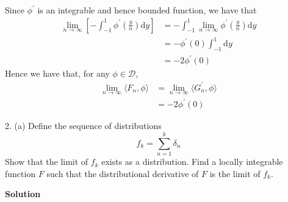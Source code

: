 \documentclass{article}
\begin{document}
%
Since $\phi^\prime$ is an integrable and hence bounded function, we have that
%
\begin{align*}
    \lim_{n \to \infty} \left[ - \int_{-1}^{1} \phi^\prime\left(\frac{y}{n}\right) \mathrm{d} y \right]
        &= - \int_{-1}^{1} \lim_{n \to \infty} \phi^\prime\left(\frac{y}{n}\right) \mathrm{d} y \\
        &= - \phi^\prime(0) \int_{-1}^{1} \mathrm{d} y \\
        &= -2 \phi^\prime(0)
\end{align*}
%
Hence we have that, for any $\phi \in \mathcal{D}$,
%
\begin{align*}
    \lim_{n \to \infty} \langle F_n, \phi \rangle
        &= \lim_{n \to \infty} \langle G_n^\prime, \phi \rangle \\
        &= -2 \phi^\prime(0)
\end{align*}

\newpage

2. (a) Define the sequence of distributions
%
\begin{equation*}
    f_k = \sum_{n = 1}^k \delta_n
\end{equation*}
%
Show that the limit of $f_k$ exists as a distribution. Find a locally
integrable function $F$ such that the distributional derivative of $F$
is the limit of $f_k$.

\textbf{Solution}
\end{document}
